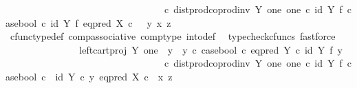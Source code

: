 \begin{isabellebody}
\ \ \ \ \ \ \ \ \ \ \ \ \ \ \ \ \ \ \ \ \ \ \ \ \ \ \ \ \ \ \ \ \ {\isasymcirc}\isactrlsub c\ dist{\isacharunderscore}{\kern0pt}prod{\isacharunderscore}{\kern0pt}coprod{\isacharunderscore}{\kern0pt}inv\ Y\ one\ one\ {\isasymcirc}\isactrlsub c\ {\isacharparenleft}{\kern0pt}id\ Y\ {\isasymtimes}\isactrlsub f\ case{\isacharunderscore}{\kern0pt}bool{\isacharparenright}{\kern0pt}\ {\isasymcirc}\isactrlsub c\ {\isacharparenleft}{\kern0pt}id\ Y\ {\isasymtimes}\isactrlsub f\ eq{\isacharunderscore}{\kern0pt}pred\ X{\isacharparenright}{\kern0pt}\ {\isasymcirc}\isactrlsub c\ \ \ {\isasymlangle}y{\isacharcomma}{\kern0pt}\ {\isasymlangle}x{\isacharcomma}{\kern0pt}\ z{\isasymrangle}{\isasymrangle}{\isachardoublequoteclose}\isanewline
\ \ \ \ \ \ \ \ \ \ \ \ \isamarkupfalse%
\ cfunc{\isacharunderscore}{\kern0pt}type{\isacharunderscore}{\kern0pt}def\ comp{\isacharunderscore}{\kern0pt}associative\ comp{\isacharunderscore}{\kern0pt}type\ into{\isacharunderscore}{\kern0pt}def\ \isamarkupfalse%
\ {\isacharparenleft}{\kern0pt}typecheck{\isacharunderscore}{\kern0pt}cfuncs{\isacharcomma}{\kern0pt}\ fastforce{\isacharparenright}{\kern0pt}\isanewline
\ \ \ \ \ \ \ \ \ \ \isamarkupfalse%
\ \isamarkupfalse%
\ {\isachardoublequoteopen}{\isachardot}{\kern0pt}{\isachardot}{\kern0pt}{\isachardot}{\kern0pt}\ {\isacharequal}{\kern0pt}\ {\isacharparenleft}{\kern0pt}left{\isacharunderscore}{\kern0pt}cart{\isacharunderscore}{\kern0pt}proj\ Y\ one\ {\isasymamalg}\ {\isacharparenleft}{\kern0pt}{\isacharparenleft}{\kern0pt}y{}\ {\isasymamalg}\ y{}{\isacharparenright}{\kern0pt}\ {\isasymcirc}\isactrlsub c\ case{\isacharunderscore}{\kern0pt}bool\ {\isasymcirc}\isactrlsub c\ eq{\isacharunderscore}{\kern0pt}pred\ Y\ {\isasymcirc}\isactrlsub c\ {\isacharparenleft}{\kern0pt}id\ Y\ {\isasymtimes}\isactrlsub f\ y{}{\isacharparenright}{\kern0pt}{\isacharparenright}{\kern0pt}{\isacharparenright}{\kern0pt}\isanewline
\ \ \ \ \ \ \ \ \ \ \ \ \ \ \ \ \ \ \ \ \ \ \ \ \ \ \ \ \ \ \ \ \ {\isasymcirc}\isactrlsub c\ dist{\isacharunderscore}{\kern0pt}prod{\isacharunderscore}{\kern0pt}coprod{\isacharunderscore}{\kern0pt}inv\ Y\ one\ one\ {\isasymcirc}\isactrlsub c\ {\isacharparenleft}{\kern0pt}id\ Y\ {\isasymtimes}\isactrlsub f\ case{\isacharunderscore}{\kern0pt}bool{\isacharparenright}{\kern0pt}\ {\isasymcirc}\isactrlsub c\ \ {\isasymlangle}id\ Y\ {\isasymcirc}\isactrlsub c\ y{\isacharcomma}{\kern0pt}\ eq{\isacharunderscore}{\kern0pt}pred\ X\ {\isasymcirc}\isactrlsub c\ \ {\isasymlangle}x{\isacharcomma}{\kern0pt}\ z{\isasymrangle}{\isasymrangle}{\isachardoublequoteclose}\isanewline

\end{isabellebody}
